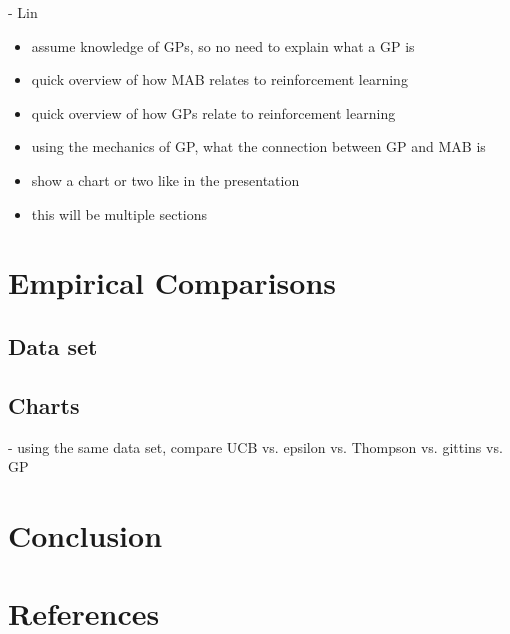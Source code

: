 \documentclass{article}
\begin{document}
- Lin
\begin{itemize}
\item assume knowledge of GPs, so no need to explain what a GP is
\item quick overview of how MAB relates to reinforcement learning
\item quick overview of how GPs relate to reinforcement learning
\item using the mechanics of GP, what the connection between GP and MAB is
\item show a chart or two like in the presentation
\item this will be multiple sections
\end{itemize}

\section{Empirical Comparisons}

\subsection{Data set}

\subsection{Charts}

- using the same data set, compare UCB vs. epsilon vs. Thompson vs. gittins vs. GP

\section{Conclusion}

\section{References}
\end{document}
